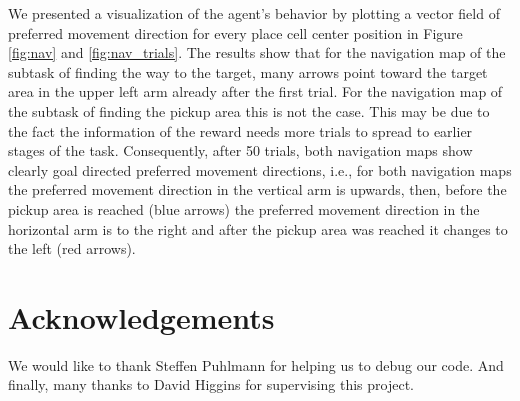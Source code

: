 We presented a visualization of the agent's behavior by plotting a vector field of preferred movement direction for every place cell center position in Figure \ref{fig:nav} and \ref{fig:nav_trials}. The results show that for the navigation map of the subtask of finding the way to the target, many arrows point toward the target area in the upper left arm already after the first trial. For the navigation map of the subtask of finding the pickup area this is not the case. This may be due to the fact the information of the reward needs more trials to spread to earlier stages of the task. Consequently, after 50 trials, both navigation maps show clearly goal directed preferred movement directions, i.e., for both navigation maps the preferred movement direction in the vertical arm is upwards, then, before the pickup area is reached (blue arrows) the preferred movement direction in the horizontal arm is to the right and after the pickup area was reached it changes to the left (red arrows). 


\section{Acknowledgements}
We would like to thank Steffen Puhlmann for helping us to debug our code. And finally, many thanks to David Higgins for supervising this project. 

